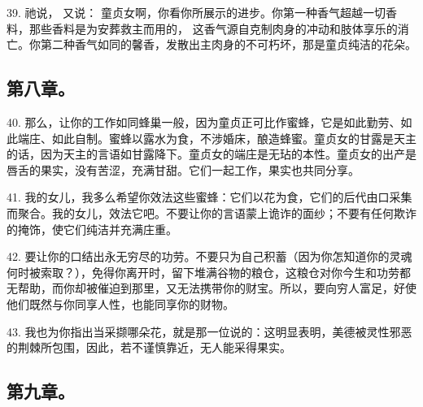 39. 祂说， 又说： 童贞女啊，你看你所展示的进步。你第一种香气超越一切香料，那些香料是为安葬救主而用的， 这香气源自克制肉身的冲动和肢体享乐的消亡。你第二种香气如同的馨香，发散出主肉身的不可朽坏，那是童贞纯洁的花朵。\par


\subsection{第八章。}

\par

40. 那么，让你的工作如同蜂巢一般，因为童贞正可比作蜜蜂，它是如此勤劳、如此端庄、如此自制。蜜蜂以露水为食，不涉婚床，酿造蜂蜜。童贞女的甘露是天主的话，因为天主的言语如甘露降下。童贞女的端庄是无玷的本性。童贞女的出产是唇舌的果实，没有苦涩，充满甘甜。它们一起工作，果实也共同分享。\par

41. 我的女儿，我多么希望你效法这些蜜蜂：它们以花为食，它们的后代由口采集而聚合。我的女儿，效法它吧。不要让你的言语蒙上诡诈的面纱；不要有任何欺诈的掩饰，使它们纯洁并充满庄重。\par

42. 要让你的口结出永无穷尽的功劳。不要只为自己积蓄（因为你怎知道你的灵魂何时被索取？），免得你离开时，留下堆满谷物的粮仓，这粮仓对你今生和功劳都无帮助，而你却被催迫到那里，又无法携带你的财宝。所以，要向穷人富足，好使他们既然与你同享人性，也能同享你的财物。\par

43. 我也为你指出当采撷哪朵花，就是那一位说的：这明显表明，美德被灵性邪恶的荆棘所包围，因此，若不谨慎靠近，无人能采得果实。\par


\subsection{第九章。}

\par

